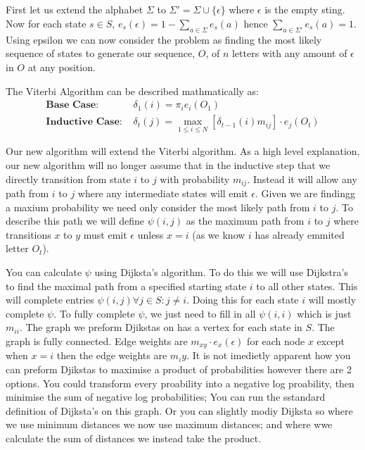 \subsection{}
First let us extend the alphabet $\Sigma$ to $\Sigma' = \Sigma \cup \{\epsilon\}$ where $\epsilon$ is the empty sting. Now for each state $s\in S$, $e_s(\epsilon) = 1 - \sum_{a\in \Sigma} e_s(a)$ hence $\sum_{a\in \Sigma'} e_s(a) = 1$. Using epsilon we can now consider the problem as finding the most likely sequence of states to generate our sequence, $O$, of $n$ letters with any amount of $\epsilon$ in $O$ at any position.

The Viterbi Algorithm can be described mathmatically as:
\begin{align*}
\textbf{Base Case: } &\delta_1(i) = \pi_i e_i(O_1)\\
\textbf{Inductive Case: } &\delta_t(j) = \max_{1\leq i \leq N}[\delta_{t-1}(i)m_{ij}]\cdot e_j(O_t)
\end{align*}

Our new algorithm will extend the Viterbi algorithm. As a high level explanation, our new algorithm will no longer assume that in the inductive step that we directly transition from state $i$ to $j$ with probability $m_{ij}$. Instead it will allow any path from $i$ to $j$ where any intermediate states will emit $\epsilon$. Given we are findingg a maxium probability we need only consider the most likely path from $i$ to $j$. To describe this path we will define $\psi(i,j)$ as the maximum path from $i$ to $j$ where transitions $x$ to $y$ must emit $\epsilon$ unless $x=i$ (as we know $i$ has already emmited letter $O_t$).

You can calculate $\psi$ using Dijksta's algorithm. To do this we will use Dijkstra's to find the maximal path from a specified starting state $i$ to all other states. This will complete entries $\psi(i,j)  \forall j \in S:j\neq i$. Doing this for each state $i$ will mostly complete $\psi$. To fully complete $\psi$, we just need to fill in all $\psi(i,i)$ which is just $m_{ii}$.
The graph we preform Djikstas on has a vertex for each state in $S$. The graph is fully connected. Edge weights are $m_{xy}\cdot e_x(\epsilon)$ for each node $x$ except when $x=i$ then the edge weights are $m_iy$. It is not imedietly apparent how you can preform Djikstas to maximise a product of probabilities however there are 2 options. You could transform every proability into a negative log proability, then minimise the sum of negative log probabilities; You can run the sstandard definition of Dijksta's on this graph. Or you can slightly modiy Dijksta so where we use minimum distances we now use maximum distances; and where wwe calculate the sum of distances we instead take the product.

